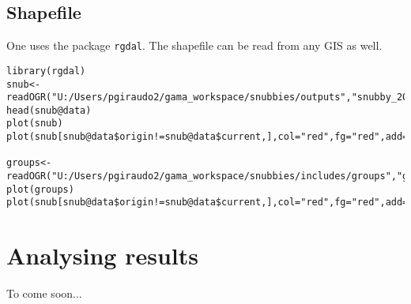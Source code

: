\subsection{Shapefile}

One uses the package \texttt{rgdal}. The shapefile can be read from any GIS as well. 

\begin{lstlisting}
library(rgdal)
snub<-readOGR("U:/Users/pgiraudo2/gama_workspace/snubbies/outputs","snubby_2019_4392")
head(snub@data)
plot(snub)
plot(snub[snub@data$origin!=snub@data$current,],col="red",fg="red",add=TRUE)

groups<-readOGR("U:/Users/pgiraudo2/gama_workspace/snubbies/includes/groups","groups")
plot(groups)
plot(snub[snub@data$origin!=snub@data$current,],col="red",fg="red",add=TRUE)

\end{lstlisting}





\section{Analysing results}




To come soon...